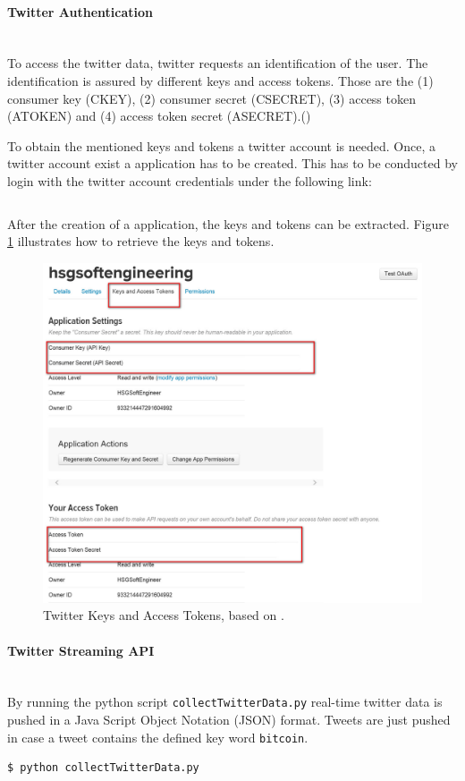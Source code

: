\documentclass[a4paper,12pt]{article}
\begin{document}
\begin{spacing}{1.2}
\paragraph{Twitter Authentication}\mbox{}\\{}
To access the twitter data, twitter requests an identification of the user. The identification is assured by different keys and access tokens. Those are the (1) consumer key (CKEY), (2) consumer secret (CSECRET), (3) access token (ATOKEN) and (4) access token secret (ASECRET).(\cite{twitterinc2017b})

To obtain the mentioned keys and tokens a twitter account is needed. Once, a twitter account exist a application has to be created. This has to be conducted by login with the twitter account credentials under the following link: 
\begin{lstlisting}[language=bash]
%https://apps.twitter.com/
\end{lstlisting}

After the creation of a application, the keys and tokens can be extracted. Figure \ref{Fig:Keys and Tokens} illustrates how to retrieve the keys and tokens.
\begin{figure}[h]
\centering
\includegraphics[scale=0.6]{twitteraccess}
\caption{Twitter Keys and Access Tokens, based on \cite{twitterinc2017c}.}
\label{Fig:Keys and Tokens}
\end{figure}

\paragraph{Twitter Streaming API}\mbox{}\\{}
By running the python script \verb|collectTwitterData.py| real-time twitter data is pushed in a Java Script Object Notation (JSON) format. Tweets are just pushed in case a tweet contains the defined key word \verb|bitcoin|.
\begin{lstlisting}[language=bash]
$ python collectTwitterData.py
\end{lstlisting}


\end{spacing}
\end{document}

